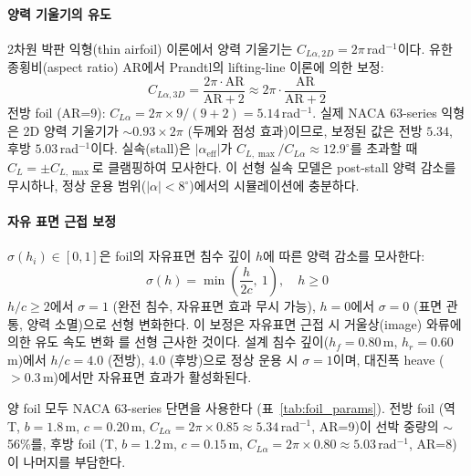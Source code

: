 \documentclass[11pt]{report}
\numberwithin{equation}{chapter}
\numberwithin{figure}{chapter}
\numberwithin{table}{chapter}
\begin{document}
\paragraph{양력 기울기의 유도}
2차원 박판 익형(thin airfoil) 이론에서 양력 기울기는 $C_{L\alpha,2D} = 2\pi$\,rad$^{-1}$이다.
유한 종횡비(aspect ratio) AR에서 Prandtl의 lifting-line 이론에 의한 보정:
\begin{equation}
  C_{L\alpha,3D} = \frac{2\pi \cdot \text{AR}}{\text{AR} + 2} \approx 2\pi \cdot \frac{\text{AR}}{\text{AR}+2}
  \label{eq:liftslope}
\end{equation}
전방 foil (AR=9): $C_{L\alpha} = 2\pi \times 9/(9+2) = 5.14$\,rad$^{-1}$.
실제 NACA 63-series 익형은 2D 양력 기울기가 $\sim 0.93 \times 2\pi$
(두께와 점성 효과)이므로, 보정된 값은 전방 $5.34$, 후방 $5.03$\,rad$^{-1}$이다.
실속(stall)은 $|\alpha_{\text{eff}}|$가 $C_{L,\max}/C_{L\alpha} \approx 12.9^\circ$를
초과할 때 $C_L = \pm C_{L,\max}$로 클램핑하여 모사한다.
이 선형 실속 모델은 post-stall 양력 감소를 무시하나,
정상 운용 범위($|\alpha| < 8^\circ$)에서의 시뮬레이션에 충분하다.

\paragraph{자유 표면 근접 보정}
$\sigma(h_i) \in [0, 1]$은 foil의 자유표면 침수 깊이 $h$에 따른 양력 감소를 모사한다:
\begin{equation}
  \sigma(h) = \min\!\left(\frac{h}{2c},\ 1\right), \quad h \geq 0
  \label{eq:surface_corr}
\end{equation}
$h/c \geq 2$에서 $\sigma=1$ (완전 침수, 자유표면 효과 무시 가능),
$h=0$에서 $\sigma=0$ (표면 관통, 양력 소멸)으로 선형 변화한다.
이 보정은 자유표면 근접 시 거울상(image) 와류에 의한 유도 속도 변화
\citep{Faltinsen2005}를 선형 근사한 것이다.
설계 침수 깊이($h_f = 0.80$\,m, $h_r = 0.60$\,m)에서
$h/c = 4.0$ (전방), $4.0$ (후방)으로 정상 운용 시 $\sigma = 1$이며,
대진폭 heave ($> 0.3$\,m)에서만 자유표면 효과가 활성화된다.

양 foil 모두 NACA 63-series 단면을 사용한다 (표~\ref{tab:foil_params}).
전방 foil (역T, $b=1.8$\,m, $c=0.20$\,m,
$C_{L\alpha} = 2\pi \times 0.85 \approx 5.34$\,rad$^{-1}$, AR=9)이
선박 중량의 $\sim$56\%를, 후방 foil (T, $b=1.2$\,m, $c=0.15$\,m,
$C_{L\alpha} = 2\pi \times 0.80 \approx 5.03$\,rad$^{-1}$, AR=8)이
나머지를 부담한다.
\end{document}
